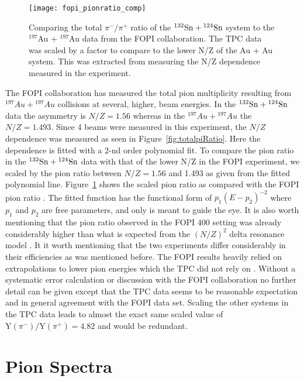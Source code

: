 \begin{figure}[!htb]
\centering
\texttt{[image: fopi\_pionratio\_comp]}
\caption{Comparing the total $\pi^-/\pi^+$ ratio of the ${}^{132}\mathrm{Sn} + {}^{124}\mathrm{Sn}$ system to the ${}^{197}$Au + ${}^{197}$Au data from the FOPI collaboration. The \spirit TPC data was scaled by a factor to compare to the lower N/Z of the Au + Au system. This was extracted from measuring the N/Z dependence measured in the experiment. }
\label{fig:fopiPionRatio}
\end{figure}

The FOPI collaboration has measured the total pion multiplicity resulting from ${}^{197}Au + {}^{197}Au$ collisions at several, higher, beam energies. In the ${}^{132}\mathrm{Sn} + {}^{124}\mathrm{Sn}$ data the asymmetry is $N/Z=1.56$ whereas in the ${}^{197}Au + {}^{197}Au$ the $N/Z=1.493$. Since 4 beams were measured in this experiment, the $N/Z$ dependence was measured as seen in Figure~\ref{fig:totalpiRatio}. Here the dependence is fitted with a 2-nd order polynomial fit. To compare the pion ratio in the ${}^{132}\mathrm{Sn} + {}^{124}\mathrm{Sn}$ data with that of the lower N/Z in the FOPI experiment, we scaled by the pion ratio between $N/Z=1.56$ and 1.493 as given from the fitted polynomial line. Figure~\ref{fig:fopiPionRatio} shows the scaled pion ratio as compared with the FOPI pion ratio \cite{fopi}. The fitted function has the functional form of $p_1(E - p_2)^{-2}$ where $p_1$ and $p_2$ are free parameters, and only is meant to guide the eye. It is also worth mentioning that the pion ratio observed in the FOPI \SI{400}{\MeVA} setting was already considerably higher than what is expected from the $(N/Z)^2$ delta resonance model \cite{baoan_piprod1,baoan_piprod2}. It it worth mentioning that the two experiments differ considerably in their efficiencies as was mentioned before. The FOPI results heavily relied on extrapolations to lower pion energies which the \spirit TPC did not rely on \cite{fopi}. Without a systematic error calculation or discussion with the FOPI collaboration no further detail can be given except that the \spirit TPC data seems to be reasonable expectation and in general agreement with the FOPI data set. Scaling the other systems in the \spirit TPC data leads to almost the exact same scaled value of $\mathrm{Y}(\pi^-)/\mathrm{Y}(\pi^+) = \num{4.82}$ and would be redundant. 




\section{Pion Spectra}
\label{sec:pionSpectra}


